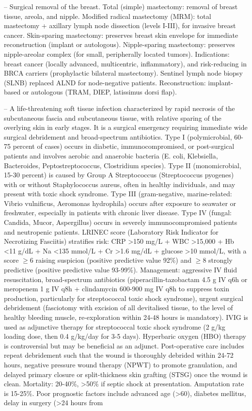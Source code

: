 -- Surgical removal of the breast. Total (simple) mastectomy: removal of breast tissue, areola, and nipple. Modified radical mastectomy (MRM): total mastectomy + axillary lymph node dissection (levels I-III), for invasive breast cancer. Skin-sparing mastectomy: preserves breast skin envelope for immediate reconstruction (implant or autologous). Nipple-sparing mastectomy: preserves nipple-areolar complex (for small, peripherally located tumors). Indications: breast cancer (locally advanced, multicentric, inflammatory), and risk-reducing in BRCA carriers (prophylactic bilateral mastectomy). Sentinel lymph node biopsy (SLNB) replaced ALND for node-negative patients. Reconstruction: implant-based or autologous (TRAM, DIEP, latissimus dorsi flap).

-- A life-threatening soft tissue infection characterized by rapid necrosis of the subcutaneous fascia and subcutaneous tissue, with relative sparing of the overlying skin in early stages. It is a surgical emergency requiring immediate wide surgical debridement and broad-spectrum antibiotics. Type I (polymicrobial, 60-75 percent of cases) occurs in diabetic, immunocompromised, or post-surgical patients and involves aerobic and anaerobic bacteria (E. coli, Klebsiella, Bacteroides, Peptostreptococcus, Clostridium species). Type II (monomicrobial, 15-30 percent) is caused by Group A Streptococcus (Streptococcus pyogenes) with or without Staphylococcus aureus, often in healthy individuals, and may present with toxic shock syndrome. Type III (gram-negative, marine-related: Vibrio vulnificus, Aeromonas hydrophila) occurs after exposure to seawater or freshwater, especially in patients with chronic liver disease. Type IV (fungal: Candida, Mucor, Aspergillus) occurs in severely immunocompromised patients and neutropenic patients. LRINEC score (Laboratory Risk Indicator for Necrotizing Fasciitis) stratifies risk: CRP >150 mg/L + WBC >15,000 + Hb <11 g/dL + Na <135 mmol/L + Cr >1.6 mg/dL + glucose >10 mmol/L, with a score \(\ge\)6 raising suspicion (positive predictive value 92\%) and \(\ge\)8 strongly predictive (positive predictive value 93-99\%). Management: aggressive IV fluid resuscitation, broad-spectrum antibiotics (piperacillin-tazobactam 4.5 g IV q6h or meropenem 1 g IV q8h + clindamycin 600-900 mg IV q8h to suppress toxin production, particularly for streptococcal toxic shock syndrome), urgent surgical debridement (fasciotomy with excision of all devitalised tissue, to the level of healthy bleeding muscle, re-exploration within 24-48 hours is mandatory). IVIG is used as adjunctive therapy for streptococcal toxic shock syndrome (2 g/kg loading dose, then 0.4 g/kg/day for 3-5 days). Hyperbaric oxygen (HBO) therapy is controversial but may be beneficial as an adjunct. Post-operative care includes repeat debridement such that the wound is thoroughly debrided within 24-72 hours, negative pressure wound therapy (NPWT) to promote granulation, and delayed primary closure or split-thickness skin grafting (STSG) once the wound is clean. Mortality: 20-40\%, >50\% if septic shock at presentation. Amputation rate is 15-25\%. Poor prognostic factors include advanced age (>60), diabetes mellitus, delay in surgery (>24 hours from 